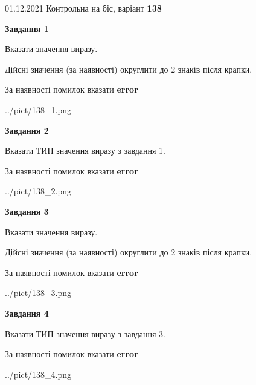 \documentclass[11pt, ukrainian]{article}
\begin{document}
{01.12.2021 Контрольна на біс, варіант  \No \textbf { 138 }\par}
{
\begin {large}
{\begin {center}\textbf{Завдання 1}\end {center}}\par
Вказати значення виразу. \par
Дійсні значення (за наявності) округлити до 2 знаків після крапки. \par
За наявності помилок вказати \textbf{error}

\begin{center}
	{../pict/138_1.png}
\end{center}
\newpage

{\begin {center}\textbf{Завдання 2}\end {center}}\par
Вказати ТИП значення виразу з завдання 1. \par
За наявності помилок вказати \textbf{error}

\begin{center}
	{../pict/138_2.png}
\end{center}
\newpage

{\begin {center}\textbf{Завдання 3}\end {center}}\par
Вказати значення виразу. \par
Дійсні значення (за наявності) округлити до 2 знаків після крапки. \par
За наявності помилок вказати \textbf{error}

\begin{center}
	{../pict/138_3.png}
\end{center}
\newpage

{\begin {center}\textbf{Завдання 4}\end {center}}\par
Вказати ТИП значення виразу з завдання 3. \par
За наявності помилок вказати \textbf{error}

\begin{center}
	{../pict/138_4.png}
\end{center}
\newpage


\end{large}}
\end{document}

